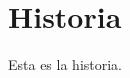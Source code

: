 \documentclass[../main.tex]{subfiles}
\begin{document}
\section{Historia}
Esta es la historia.
\clearpage
\end{document}
